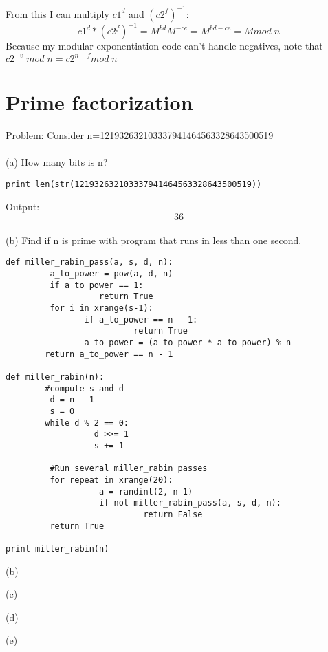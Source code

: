 \documentclass[12pt]{article}
\begin{document}
From this I can multiply $c1^d$ and $(c2^f)^{-1}$: \[c1^d * (c2^f)^{-1} = M^{bd}M^{-ce} = M^{bd-ce}=M mod  \; n\]
Because my modular exponentiation code can't handle negatives, note that $c2^{-v} \; mod \; n = c2^{n-f} mod \; n$


\section{Prime factorization}

Problem: Consider n=121932632103337941464563328643500519
\\\\(a) How many bits is n?
\begin{verbatim}
print len(str(121932632103337941464563328643500519))
\end{verbatim}
Output:  \[\boxed{36}\] 
\\(b) Find if n is prime with program that runs in less than one second.
\begin{verbatim}
def miller_rabin_pass(a, s, d, n):
         a_to_power = pow(a, d, n)
         if a_to_power == 1:
                   return True
         for i in xrange(s-1):
                if a_to_power == n - 1:
                          return True
                a_to_power = (a_to_power * a_to_power) % n
        return a_to_power == n - 1

def miller_rabin(n):
        #compute s and d
         d = n - 1
         s = 0
        while d % 2 == 0:
                  d >>= 1
                  s += 1

         #Run several miller_rabin passes
         for repeat in xrange(20):
                   a = randint(2, n-1)
                   if not miller_rabin_pass(a, s, d, n):
                            return False
         return True

print miller_rabin(n)
\end{verbatim}

(b)

(c)

(d)

(e)
\end{document}
